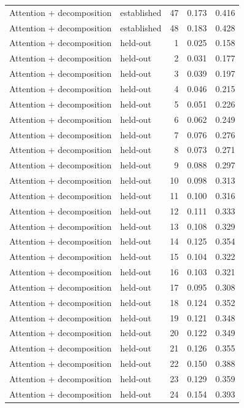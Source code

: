 \begin{tabular}{llrrr}
Attention + decomposition & established & 47 & 0.173 & 0.416 \\
Attention + decomposition & established & 48 & 0.183 & 0.428 \\
Attention + decomposition & held-out & 1 & 0.025 & 0.158 \\
Attention + decomposition & held-out & 2 & 0.031 & 0.177 \\
Attention + decomposition & held-out & 3 & 0.039 & 0.197 \\
Attention + decomposition & held-out & 4 & 0.046 & 0.215 \\
Attention + decomposition & held-out & 5 & 0.051 & 0.226 \\
Attention + decomposition & held-out & 6 & 0.062 & 0.249 \\
Attention + decomposition & held-out & 7 & 0.076 & 0.276 \\
Attention + decomposition & held-out & 8 & 0.073 & 0.271 \\
Attention + decomposition & held-out & 9 & 0.088 & 0.297 \\
Attention + decomposition & held-out & 10 & 0.098 & 0.313 \\
Attention + decomposition & held-out & 11 & 0.100 & 0.316 \\
Attention + decomposition & held-out & 12 & 0.111 & 0.333 \\
Attention + decomposition & held-out & 13 & 0.108 & 0.329 \\
Attention + decomposition & held-out & 14 & 0.125 & 0.354 \\
Attention + decomposition & held-out & 15 & 0.104 & 0.322 \\
Attention + decomposition & held-out & 16 & 0.103 & 0.321 \\
Attention + decomposition & held-out & 17 & 0.095 & 0.308 \\
Attention + decomposition & held-out & 18 & 0.124 & 0.352 \\
Attention + decomposition & held-out & 19 & 0.121 & 0.348 \\
Attention + decomposition & held-out & 20 & 0.122 & 0.349 \\
Attention + decomposition & held-out & 21 & 0.126 & 0.355 \\
Attention + decomposition & held-out & 22 & 0.150 & 0.388 \\
Attention + decomposition & held-out & 23 & 0.129 & 0.359 \\
Attention + decomposition & held-out & 24 & 0.154 & 0.393 \\

\end{tabular}
